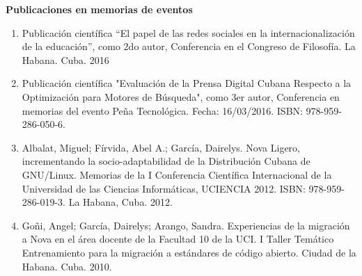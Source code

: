 \textbf{\large{Publicaciones en memorias de eventos}}
\begin{enumerate}
	\item Publicación científica “El papel de las redes sociales en la internacionalización de la 	educación”, como 2do autor, Conferencia en el Congreso de Filosofía. La Habana. Cuba. 2016
	\item Publicación científica "Evaluación de la Prensa Digital Cubana Respecto a la Optimización para Motores de Búsqueda", como 3er autor, Conferencia en memorias del evento Peña Tecnológica. Fecha: 16/03/2016. ISBN: 978-959-286-050-6.
	\item Albalat, Miguel; Fírvida, Abel A.; García, Dairelys. Nova Ligero, incrementando la socio-adaptabilidad de la Distribución Cubana de GNU/Linux. Memorias de la I Conferencia Científica Internacional de la Universidad de las Ciencias Informáticas, UCIENCIA 2012. ISBN: 978-959-286-019-3. La Habana, Cuba. 2012.
	\item Goñi, Angel; García, Dairelys; Arango, Sandra. Experiencias de la migración a Nova en el área docente de la Facultad 10 de la UCI. I Taller Temático Entrenamiento para la migración a estándares de código abierto. Ciudad de la Habana. Cuba. 2010.
\end{enumerate}